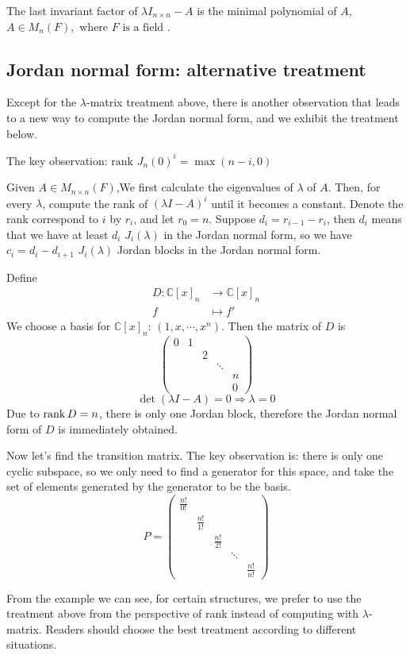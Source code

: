 \begin{theorem}
The last invariant factor of $\lambda I_{n\times n}-A$ is the minimal polynomial of $A$, $A\in M_n(F),\text{ where }F\text{ is a field}$ .
\end{theorem}


\subsection{Jordan normal form: alternative treatment}
Except for the $\lambda$-matrix treatment above, there is another observation that leads to a new way to compute the Jordan normal form, and we exhibit the treatment below.\par
The key observation: $\text{rank }J_n(0)^i=\max (n-i,0)$\par 
Given $A\in M_{n\times n}(F)$,We first calculate the eigenvalues of $\lambda$ of $A$. Then, for every $\lambda$, compute the rank of $(\lambda I-A)^i$ until it becomes a constant. Denote the rank correspond to $i$ by $r_i$, and let $r_0=n$.
Suppose $d_i=r_{i-1}-r_i$, then $d_i$ means that we have at least $d_i$ $J_i(\lambda)$ in the Jordan normal form, so we have $c_i=d_i-d_{i+1}$ $J_i(\lambda)$ Jordan blocks in the Jordan normal form.
\begin{example}
Define
\begin{align*}
    D: \mathbb{C}[x]_n&\longrightarrow \mathbb{C}[x]_n \\
    f&\longmapsto f'
\end{align*}
We choose a basis for $\mathbb{C}[x]_n$: $(1,x,\cdots,x^n)$. Then the matrix of $D$ is \[\begin{pmatrix}
 0 & 1 &  &  & \\
  &  & 2 &  & \\
  &  &  & \ddots & \\
  &  &  &  &n \\
  &  &  &  &0
\end{pmatrix}\]
\[\det (\lambda I-A)=0 \Longrightarrow \lambda=0\]
Due to $\operatorname{rank} D=n$, there is only one Jordan block, therefore the Jordan normal form of $D$ is immediately obtained.\par
Now let's find the transition matrix. The key observation is: there is only one cyclic subspace, so we only need to find a generator for this space, and take the set of elements generated by the generator to be the basis.
\[P=\begin{pmatrix}
 \frac{n!}{0!} &  &  &  & \\
  & \frac{n!}{1!} &  &  & \\
  &  & \frac{n!}{2!} &  & \\
  &  &  &\ddots  & \\
  &  &  &  &\frac{n!}{n!}
\end{pmatrix}\]
\end{example}
From the example we can see, for certain structures, we prefer to use the treatment above from the perspective of rank instead of computing with $\lambda$-matrix. Readers should choose the best treatment according to different situations.


